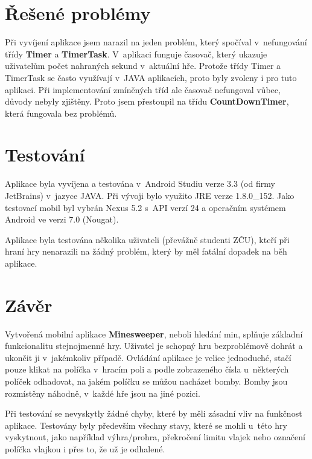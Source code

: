\documentclass[12pt, a4paper]{article}
\begin{document}
\section{Řešené problémy}
Při vyvíjení aplikace jsem narazil na jeden problém, který spočíval v~nefungování třídy \textbf{Timer} a \textbf{TimerTask}. V~aplikaci funguje časovač, který ukazuje uživatelům počet nahraných sekund v~aktuální hře. Protože třídy Timer a TimerTask se často využívají v~JAVA aplikacích, proto byly zvoleny i pro tuto aplikaci. Při implementování zmíněných tříd ale časovač nefungoval vůbec, důvody nebyly zjištěny. Proto jsem přestoupil na třídu \textbf{CountDownTimer}, která fungovala bez problémů.
\newpage


\section{Testování}
Aplikace byla vyvíjena a testována v~Android Studiu verze 3.3 (od firmy JetBrains) v~jazyce JAVA. Při vývoji bylo využito JRE verze 1.8.0\_152. Jako testovací mobil byl vybrán Nexus 5.2 s~API verzí 24 a operačním systémem Android ve verzi 7.0 (Nougat). 
\par
Aplikace byla testována několika uživateli (převážně studenti ZČU), kteří při hraní hry nenarazili na žádný problém, který by měl fatální dopadek na běh aplikace.
\newpage


\section{Závěr}
Vytvořená mobilní aplikace \textbf{Minesweeper}, neboli hledání min, splňuje základní funkcionalitu stejnojmenné hry. Uživatel je schopný hru bezproblémově dohrát a ukončit ji v~jakémkoliv případě. Ovládání aplikace je velice jednoduché, stačí pouze klikat na políčka v~hracím poli a podle zobrazeného čísla u~některých políček odhadovat, na jakém políčku se můžou nacházet bomby. Bomby jsou rozmístěny náhodně, v~každé hře jsou na jiné pozici. 
\par
Při testování se nevyskytly žádné chyby, které by měli zásadní vliv na funkčnost aplikace. Testovány byly především všechny stavy, které se mohli u~této hry vyskytnout, jako například výhra/prohra, překročení limitu vlajek nebo označení políčka vlajkou i přes to, že už je odhalené.
\end{document}
